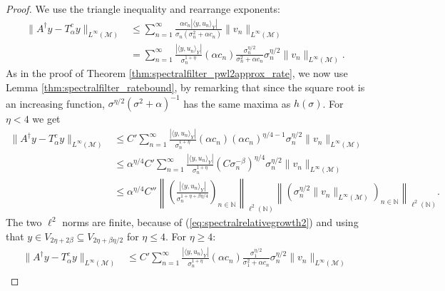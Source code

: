 \documentclass{article}
\theoremstyle{definition}
\newcommand{\N}{\mathbb{N}}
\newcommand{\smallnorm}[1]{\lVert#1\rVert}
\newcommand{\norm}[1]{\left\lVert#1\right\rVert}
\newcommand{\abs}[1]{\left\lvert#1\right\rvert}
\newcommand{\pseudoinv}[1]{{#1}^\dagger}
\begin{document}
\begin{proof}
We use the triangle inequality and rearrange exponents:
\begin{align*}
    \smallnorm{\pseudoinv{A} y - T^c_\alpha y}_{L^\infty(\mathcal{M})}
    & \leq
    \sum_{n=1}^\infty 
    \frac{\alpha c_n
    \abs{\langle y, u_n \rangle_Y}}{\sigma_n\left(\sigma_n^2+\alpha c_n\right)}
    \smallnorm{v_n
    }_{L^\infty(\mathcal{M})}\\
    & =
    \sum_{n=1}^\infty 
    \frac{ \abs{\langle y, u_n \rangle_Y}}{
    \sigma_n^{1+\eta}}
    (\alpha c_n)
    \frac{\sigma_n^{\eta/2}}
    {\sigma_n^2+\alpha c_n}
    \sigma_n^{\eta/2}
    \smallnorm{v_n}_{L^\infty(\mathcal{M})}.
\end{align*}
As in the proof of Theorem \ref{thm:spectralfilter_pwl2approx_rate},
we now use Lemma \ref{thm:spectralfilter_ratebound},
by remarking that since the square root is an increasing function, \(\sigma^{\eta/2}(\sigma^2+\alpha)^{-1}\) has the same maxima as \(h(\sigma)\).
For \(\eta< 4\) we get
\begin{align*}
    \smallnorm{\pseudoinv{A} y - T^c_\alpha y}_{L^\infty(\mathcal{M})}
    & \leq
    C'
    \sum_{n=1}^\infty 
    \frac{ \abs{\langle y, u_n \rangle_Y}}{
    \sigma_n^{1+\eta}}
    (\alpha c_n)
    (\alpha c_n)^{\eta/4-1}
    \sigma_n^{\eta/2}
    \smallnorm{v_n}_{L^\infty(\mathcal{M})}\\
    & \leq
    \alpha^{\eta/4}
    C'
    \sum_{n=1}^\infty 
    \frac{ \abs{\langle y, u_n \rangle_Y}}{
    \sigma_n^{1+\eta}}
    (C\sigma_n^{-\beta})^{\eta/4}
    \sigma_n^{\eta/2}
    \smallnorm{v_n}_{L^\infty(\mathcal{M})}\\
    &\leq
    \alpha^{\eta/4} C''
    \norm{\left(
    \frac{
    \abs{\langle y, u_n \rangle_Y}}{
    \sigma_n^{1+\eta+\beta\eta/4}}    
    \right)_{n\in\N}}_{\ell^2(\N)}
    \norm{\left(
    \sigma_n^{\eta/2}
    \smallnorm{v_n
    }_{L^\infty(\mathcal{M})}
    \right)_{n\in\N}}_{\ell^2(\N)}.
\end{align*}
The two $\ell^2$ norms are finite, because of (\ref{eq:spectralrelativegrowth2}) and using that \(y\in V_{2\eta+2\beta}\subseteq V_{2\eta+\beta\eta/2}\) for \(\eta\leq 4\).
For \(\eta\geq 4\):
\begin{align*}
    \smallnorm{\pseudoinv{A} y - T^c_\alpha y}_{L^\infty(\mathcal{M})}
    & \leq
    C'
    \sum_{n=1}^\infty 
    \frac{ \abs{\langle y, u_n \rangle_Y}}{
    \sigma_n^{1+\eta}}
    (\alpha c_n)
    \frac{\sigma_1^{\eta/2}}{\sigma_1^2 + \alpha c_n}
    \sigma_n^{\eta/2}
    \smallnorm{v_n}_{L^\infty(\mathcal{M})}\\

\end{align*}
\end{proof}
\end{document}
